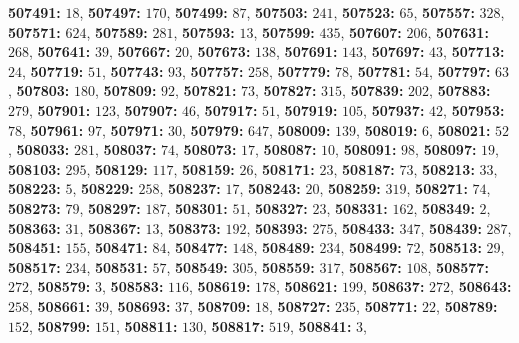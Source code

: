 \textsf{\bfseries 507491:} $18$, \textsf{\bfseries 507497:} $170$, \textsf{\bfseries 507499:} $87$, \textsf{\bfseries 507503:} $241$, \textsf{\bfseries 507523:} $65$, \textsf{\bfseries 507557:} $328$, \textsf{\bfseries 507571:} $624$, \textsf{\bfseries 507589:} $281$, \textsf{\bfseries 507593:} $13$, \textsf{\bfseries 507599:} $435$, \textsf{\bfseries 507607:} $206$, \textsf{\bfseries 507631:} $268$, \textsf{\bfseries 507641:} $39$, \textsf{\bfseries 507667:} $20$, \textsf{\bfseries 507673:} $138$, \textsf{\bfseries 507691:} $143$, \textsf{\bfseries 507697:} $43$, \textsf{\bfseries 507713:} $24$, \textsf{\bfseries 507719:} $51$, \textsf{\bfseries 507743:} $93$, \textsf{\bfseries 507757:} $258$, \textsf{\bfseries 507779:} $78$, \textsf{\bfseries 507781:} $54$, \textsf{\bfseries 507797:} $63$, \textsf{\bfseries 507803:} $180$, \textsf{\bfseries 507809:} $92$, \textsf{\bfseries 507821:} $73$, \textsf{\bfseries 507827:} $315$, \textsf{\bfseries 507839:} $202$, \textsf{\bfseries 507883:} $279$, \textsf{\bfseries 507901:} $123$, \textsf{\bfseries 507907:} $46$, \textsf{\bfseries 507917:} $51$, \textsf{\bfseries 507919:} $105$, \textsf{\bfseries 507937:} $42$, \textsf{\bfseries 507953:} $78$, \textsf{\bfseries 507961:} $97$, \textsf{\bfseries 507971:} $30$, \textsf{\bfseries 507979:} $647$, \textsf{\bfseries 508009:} $139$, \textsf{\bfseries 508019:} $6$, \textsf{\bfseries 508021:} $52$, \textsf{\bfseries 508033:} $281$, \textsf{\bfseries 508037:} $74$, \textsf{\bfseries 508073:} $17$, \textsf{\bfseries 508087:} $10$, \textsf{\bfseries 508091:} $98$, \textsf{\bfseries 508097:} $19$, \textsf{\bfseries 508103:} $295$, \textsf{\bfseries 508129:} $117$, \textsf{\bfseries 508159:} $26$, \textsf{\bfseries 508171:} $23$, \textsf{\bfseries 508187:} $73$, \textsf{\bfseries 508213:} $33$, \textsf{\bfseries 508223:} $5$, \textsf{\bfseries 508229:} $258$, \textsf{\bfseries 508237:} $17$, \textsf{\bfseries 508243:} $20$, \textsf{\bfseries 508259:} $319$, \textsf{\bfseries 508271:} $74$, \textsf{\bfseries 508273:} $79$, \textsf{\bfseries 508297:} $187$, \textsf{\bfseries 508301:} $51$, \textsf{\bfseries 508327:} $23$, \textsf{\bfseries 508331:} $162$, \textsf{\bfseries 508349:} $2$, \textsf{\bfseries 508363:} $31$, \textsf{\bfseries 508367:} $13$, \textsf{\bfseries 508373:} $192$, \textsf{\bfseries 508393:} $275$, \textsf{\bfseries 508433:} $347$, \textsf{\bfseries 508439:} $287$, \textsf{\bfseries 508451:} $155$, \textsf{\bfseries 508471:} $84$, \textsf{\bfseries 508477:} $148$, \textsf{\bfseries 508489:} $234$, \textsf{\bfseries 508499:} $72$, \textsf{\bfseries 508513:} $29$, \textsf{\bfseries 508517:} $234$, \textsf{\bfseries 508531:} $57$, \textsf{\bfseries 508549:} $305$, \textsf{\bfseries 508559:} $317$, \textsf{\bfseries 508567:} $108$, \textsf{\bfseries 508577:} $272$, \textsf{\bfseries 508579:} $3$, \textsf{\bfseries 508583:} $116$, \textsf{\bfseries 508619:} $178$, \textsf{\bfseries 508621:} $199$, \textsf{\bfseries 508637:} $272$, \textsf{\bfseries 508643:} $258$, \textsf{\bfseries 508661:} $39$, \textsf{\bfseries 508693:} $37$, \textsf{\bfseries 508709:} $18$, \textsf{\bfseries 508727:} $235$, \textsf{\bfseries 508771:} $22$, \textsf{\bfseries 508789:} $152$, \textsf{\bfseries 508799:} $151$, \textsf{\bfseries 508811:} $130$, \textsf{\bfseries 508817:} $519$, \textsf{\bfseries 508841:} $3$, 
